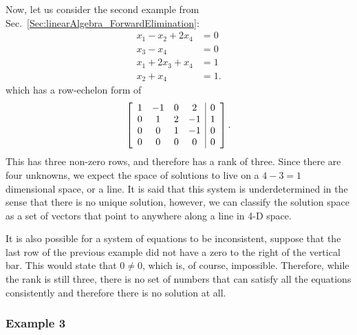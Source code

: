 Now, let us consider the second example from Sec.~\ref{Sec:linearAlgebra_ForwardElimination}:
\begin{align}
    x_1 -  x_2         + 2 x_4 &= 0 \nonumber \\
                   x_3 -   x_4 &= 0 \nonumber \\
    x_1        + 2 x_3 +   x_4 &= 1 \nonumber \\
           x_2         +   x_4 &= 1. \nonumber
\end{align}
which has a row-echelon form of
\begin{align}
  \left[ \begin{array}{c c c c | c} 
   1 & -1 &  0 &  2 &  0 \\
   0 &  1 &  2 & -1 &  1 \\
   0 &  0 &  1 & -1 &  0 \\
   0 &  0 &  0 &  0 &  0 \\ \end{array} \right] . \nonumber
\end{align}
This has three non-zero rows, and therefore has a rank of three. Since there are four unknowns, we expect the space of solutions to live on a $4-3 = 1$ dimensional space, or a line. It is said that this system is underdetermined in the sense that there is no unique solution, however, we can classify the solution space as a set of vectors that point to anywhere along a line in 4-D space.

It is also possible for a system of equations to be inconsistent, suppose that the last row of the previous example did not have a zero to the right of the vertical bar. This would state that $0 \ne 0$, which is, of course, impossible. Therefore, while the rank is still three, there is no set of numbers that can satisfy all the equations consistently and therefore there is no solution at all.

\subsubsection{Example 3} 

